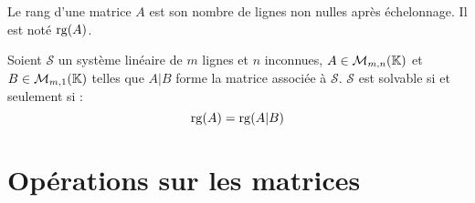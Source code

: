 \begin{definition}
	Le rang d'une matrice $A$ est son nombre de lignes non nulles après échelonnage. Il est noté $\operatorname{rg}(A)$.
\end{definition}

\begin{theorem}
    Soient $\mathcal{S}$ un système linéaire de $m$ lignes et $n$ inconnues, $A \in \mathcal{M}_{m,n}(\mathbb{K})$ et $B \in \mathcal{M}_{m,1}(\mathbb{K})$ telles que $A|B$ forme la matrice associée à $\mathcal{S}$. $\mathcal{S}$ est solvable si et seulement si :
    \[ \operatorname{rg}(A) = \operatorname{rg}(A|B) \]
\end{theorem}

\section{Opérations sur les matrices}
